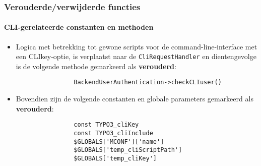 
\begin{frame}[fragile]
	\frametitle{Verouderde/verwijderde functies}
	\framesubtitle{CLI-gerelateerde constanten en methoden}


	\begin{itemize}

		\item Logica met betrekking tot gewone scripts voor de command-line-interface met een CLIkey-optie, 
			is verplaatst naar de \texttt{CliRequestHandler} en dientengevolge is de volgende methode 
			gemarkeerd als \textbf{verouderd}:

			\begin{lstlisting}
				BackendUserAuthentication->checkCLIuser()
			\end{lstlisting}

		\item Bovendien zijn de volgende constanten en globale parameters gemarkeerd als
			 \textbf{verouderd}:

			\begin{lstlisting}
				const TYPO3_cliKey
				const TYPO3_cliInclude
				$GLOBALS['MCONF']['name']
				$GLOBALS['temp_cliScriptPath']
				$GLOBALS['temp_cliKey']
			\end{lstlisting}

	\end{itemize}

\end{frame}


